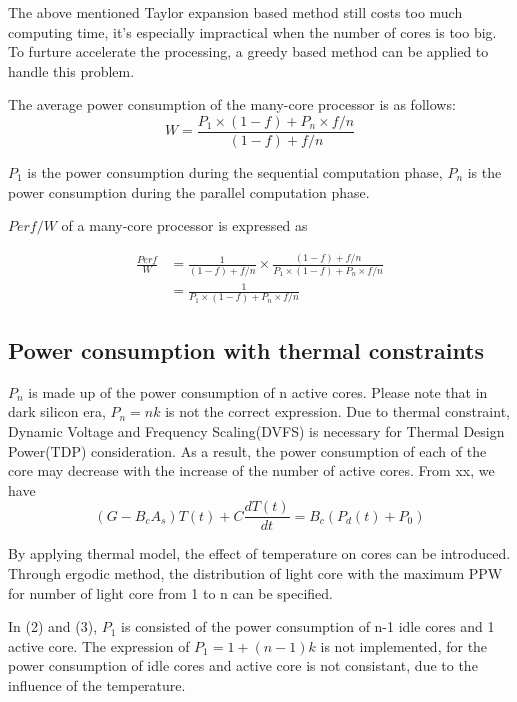 The above mentioned Taylor expansion based method still costs too much computing time, it's 
especially impractical when the number of cores is too big. To furture accelerate the 
processing, a greedy based method can be applied to handle this problem. 




The average power consumption of the many-core processor is as follows:
\begin{equation}\label{average_power}
W = \frac{P_{1} \times (1-f)+P_{n} \times f/n}{(1-f)+f/n}
\end{equation}

$P_{1}$ is the power consumption during the sequential computation phase, $P_{n}$ is the power 
consumption during the parallel computation phase. 

$Perf/W$ of a many-core processor is expressed as

\begin{equation}\label{ppw}
\begin{split}
\frac{Perf}{W} &= \frac{1}{(1-f)+f/n} \times \frac{(1-f)+f/n}{P_{1} \times (1-f)+P_{n} \times f/n}\\
&= \frac{1}{P_{1} \times (1-f)+P_{n} \times f/n}
\end{split}
\end{equation}


\subsection{Power consumption with thermal constraints}
$P_{n}$ is made up of the power consumption of n active cores. Please note that in dark silicon
era, $P_{n} = nk$ is not the correct expression. Due to thermal constraint, Dynamic Voltage and
Frequency Scaling(DVFS) is necessary for Thermal Design Power(TDP) consideration. As a result,
the power consumption of each of the core may decrease with the increase of the number of active cores.
From xx, we have
\begin{equation}\label{gt=bp}
(G - B_{c}A_{s})T(t) + C\frac{dT(t)}{dt}= B_{c}(P_{d}(t) + P_{0})
\end{equation}

By applying thermal model, the effect of temperature on cores can be introduced. 
Through ergodic method, the distribution of light core with the maximum PPW
for number of light core from 1 to n can be specified.

In (2) and (3), $P_{1}$ is consisted of the power consumption of n-1 idle cores and 1 active 
core. The expression of $P_{1} = 1+(n-1)k$ is not implemented, for the power consumption of 
idle cores and active core is not consistant, due to the influence of the temperature.

